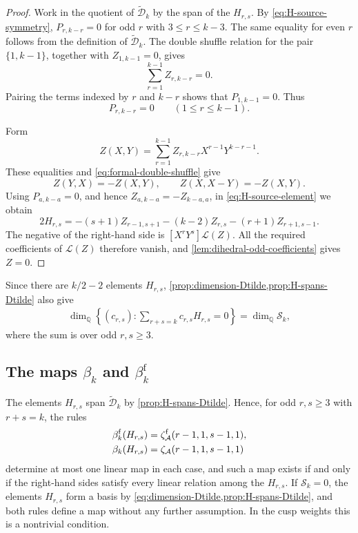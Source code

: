 \documentclass[12pt]{amsart}
\numberwithin{equation}{section}
\theoremstyle{plain}
\newcommand{\QQ}{\mathbb{Q}}
\newcommand{\za}[1]{\zeta_{\mathcal A}(#1)}
\newcommand{\zaf}[1]{\zeta_{\mathcal A}^{\mathrm f}(#1)}
\newcommand{\Dtk}{\widetilde{\mathcal D}_k}
\begin{document}
\begin{proof}
Work in the quotient of $\Dtk$ by the span of the $H_{r,s}$. By
\eqref{eq:H-source-symmetry},
$P_{r,k-r}=0$ for odd $r$ with $3\leq r\leq k-3$.
The same equality for even $r$ follows from the definition of $\Dtk$.
The double shuffle relation for the pair $\{1,k-1\}$, together with
$Z_{1,k-1}=0$, gives
\[
 \sum_{r=1}^{k-1}Z_{r,k-r}=0.
\]
Pairing the terms indexed by $r$ and $k-r$ shows that
$P_{1,k-1}=0$. Thus
\[
 P_{r,k-r}=0\qquad(1\leq r\leq k-1).
\]

Form
\[
 Z(X,Y)=\sum_{r=1}^{k-1}Z_{r,k-r}X^{r-1}Y^{k-r-1}.
\]
These equalities and \eqref{eq:formal-double-shuffle} give
\[
 Z(Y,X)=-Z(X,Y),\qquad Z(X,X-Y)=-Z(X,Y).
\]
Using $P_{a,k-a}=0$, and hence
$Z_{a,k-a}=-Z_{k-a,a}$, in \eqref{eq:H-source-element} we obtain
\[
 2H_{r,s}=-(s+1)Z_{r-1,s+1}-(k-2)Z_{r,s}
 -(r+1)Z_{r+1,s-1}.
\]
The negative of the right-hand side is
$[X^rY^s]\mathcal L(Z)$. All the required coefficients of $\mathcal L(Z)$ therefore vanish,
and \cref{lem:dihedral-odd-coefficients} gives $Z=0$.
\end{proof}

Since there are $k/2-2$ elements $H_{r,s}$,
\cref{prop:dimension-Dtilde,prop:H-spans-Dtilde} also give
\begin{align}\label{eq:H-relation-dimension}
 \dim_{\QQ}\left\{(c_{r,s}):
 \sum_{r+s=k}c_{r,s}H_{r,s}=0\right\}
 =\dim_{\QQ}\mathcal S_k,
\end{align}
where the sum is over odd $r,s\geq3$.

\subsection{The maps \texorpdfstring{$\beta_k$ and $\beta_k^{\mathrm f}$}{beta-k and beta-k-f}}

The elements $H_{r,s}$ span $\Dtk$ by \cref{prop:H-spans-Dtilde}.
Hence, for odd $r,s\geq3$ with $r+s=k$, the rules
\begin{align}\label{eq:direct-beta-rules}
 \beta_k^{\mathrm f}(H_{r,s})
 &=\zaf{r-1,1,s-1,1},\notag\\
 \beta_k(H_{r,s})
 &=\za{r-1,1,s-1,1}
\end{align}
determine at most one linear map in each case, and such a map exists
if and only if the right-hand sides satisfy every linear relation
among the $H_{r,s}$.
If $\mathcal S_k=0$, the elements $H_{r,s}$ form a basis by
\cref{eq:dimension-Dtilde,prop:H-spans-Dtilde}, and both rules define a
map without any further assumption. In the cusp weights this is a
nontrivial condition.
\end{document}
